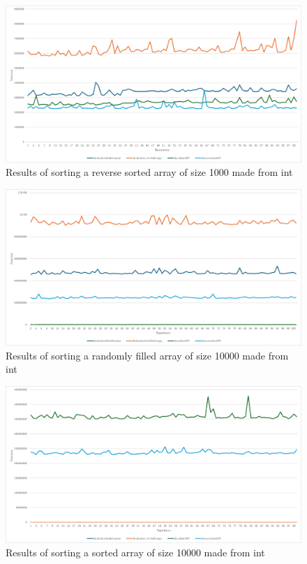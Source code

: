 \documentclass{article}
\begin{document}
\begin{figure}[!h]
    \centering
    \includegraphics[width=0.7\linewidth]{int_1000_reverse_sorted.png}
    \caption{Results of sorting a reverse sorted array of size 1000 made from int}
    \label{fig:int_1000_reverse_sorted}
\end{figure}

\begin{figure}[!h]
    \centering
    \includegraphics[width=0.7\linewidth]{int_10000_random.png}
    \caption{Results of sorting a randomly filled array of size 10000 made from int}
    \label{fig:int_10000_random}
\end{figure}

\begin{figure}[!h]
    \centering
    \includegraphics[width=0.7\linewidth]{int_10000_sorted.png}
    \caption{Results of sorting a sorted array of size 10000 made from int}
    \label{fig:int_10000_sorted}
\end{figure}
\end{document}
